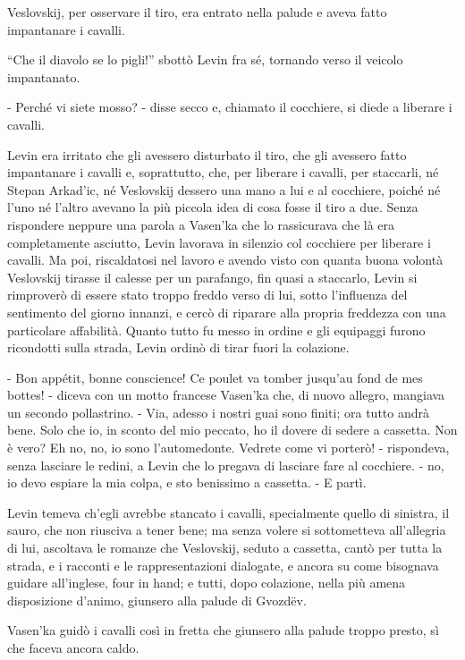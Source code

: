 Veslovskij, per osservare il tiro, era entrato nella palude e aveva fatto impantanare i cavalli. 

``Che il diavolo se lo pigli!'' sbottò Levin fra sé, tornando verso il veicolo impantanato. 

- Perché vi siete mosso? - disse secco e, chiamato il cocchiere, si diede a liberare i cavalli. 

Levin era irritato che gli avessero disturbato il tiro, che gli avessero fatto impantanare i cavalli e, soprattutto, che, per liberare i cavalli, per staccarli, né Stepan Arkad'ic, né Veslovskij dessero una mano a lui e al cocchiere, poiché né l'uno né l'altro avevano la più piccola idea di cosa fosse il tiro a due. Senza rispondere neppure una parola a Vasen'ka che lo rassicurava che là era completamente asciutto, Levin lavorava in silenzio col cocchiere per liberare i cavalli. Ma poi, riscaldatosi nel lavoro e avendo visto con quanta buona volontà Veslovskij tirasse il calesse per un parafango, fin quasi a staccarlo, Levin si rimproverò di essere stato troppo freddo verso di lui, sotto l'influenza del sentimento del giorno innanzi, e cercò di riparare alla propria freddezza con una particolare affabilità. Quanto tutto fu messo in ordine e gli equipaggi furono ricondotti sulla strada, Levin ordinò di tirar fuori la colazione. 

- Bon appétit, bonne conscience! Ce poulet va tomber jusqu'au fond de mes bottes! - diceva con un motto francese Vasen'ka che, di nuovo allegro, mangiava un secondo pollastrino. - Via, adesso i nostri guai sono finiti; ora tutto andrà bene. Solo che io, in sconto del mio peccato, ho il dovere di sedere a cassetta. Non è vero? Eh no, no, io sono l'automedonte. Vedrete come vi porterò! - rispondeva, senza lasciare le redini, a Levin che lo pregava di lasciare fare al cocchiere. - no, io devo espiare la mia colpa, e sto benissimo a cassetta. - E partì. 

Levin temeva ch'egli avrebbe stancato i cavalli, specialmente quello di sinistra, il sauro, che non riusciva a tener bene; ma senza volere si sottometteva all'allegria di lui, ascoltava le romanze che Veslovskij, seduto a cassetta, cantò per tutta la strada, e i racconti e le rappresentazioni dialogate, e ancora su come bisognava guidare all'inglese, four in hand; e tutti, dopo colazione, nella più amena disposizione d'animo, giunsero alla palude di Gvozdëv. 

Vasen'ka guidò i cavalli così in fretta che giunsero alla palude troppo presto, sì che faceva ancora caldo. 


